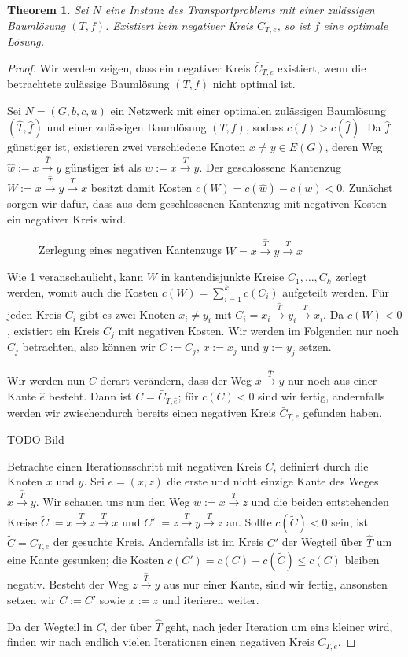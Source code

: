 \documentclass[a4paper,twoside,ngerman]{report}
\theoremstyle{plain}
\newtheorem{thm}{Theorem}
\theoremstyle{definition}
\begin{document}
\begin{thm}\label{opt}Sei $N$ eine Instanz des Transportproblems mit einer zulässigen Baumlösung $(T,f)$. Existiert kein negativer Kreis $\bar{C}_{T,e}$, so ist $f$ eine optimale Lösung.\end{thm}
\begin{proof}Wir werden zeigen, dass ein negativer Kreis $\bar{C}_{T,e}$ existiert, wenn die betrachtete zulässige Baumlösung $(T,f)$ nicht optimal ist.
	
Sei $N=(G,b,c,u)$ ein Netzwerk mit einer optimalen zulässigen Baumlösung $(\hat{T},\hat{f})$ und einer zulässigen Baumlösung $(T,f)$, sodass $c(f)>c(\hat{f})$. Da $\hat{f}$ günstiger ist, existieren zwei verschiedene Knoten $x\neq y\in E(G)$, deren Weg $\hat{w}:=x\xrightarrow{\hat{T}}y$ günstiger ist als $w:=x\xrightarrow{T}y$. Der geschlossene Kantenzug $W:=x\xrightarrow{\hat{T}}y\xrightarrow{T}x$ besitzt damit Kosten $c(W)=c(\hat{w})-c(w)<0$. Zunächst sorgen wir dafür, dass aus dem geschlossenen Kantenzug mit negativen Kosten ein negativer Kreis wird.

\begin{figure}[!h]\centering
	
\caption{Zerlegung eines negativen Kantenzugs $W=x\xrightarrow{\hat{T}}y\xrightarrow{T}x$}
\label{fig:decomp}
\end{figure}

Wie \cref{fig:decomp} veranschaulicht, kann $W$ in kantendisjunkte Kreise $C_1,\ldots,C_k$ zerlegt werden, womit auch die Kosten $c(W)=\sum_{i=1}^{k}c(C_i)$ aufgeteilt werden. Für jeden Kreis $C_i$ gibt es zwei Knoten $x_i\neq y_i$ mit $C_i=x_i\xrightarrow{\hat{T}}y_i\xrightarrow{T}x_i$. Da $c(W)<0$, existiert ein Kreis $C_j$ mit negativen Kosten. Wir werden im Folgenden nur noch $C_j$ betrachten, also können wir $C:=C_j$, $x:=x_j$ und $y:=y_j$ setzen.

Wir werden nun $C$ derart verändern, dass der Weg $x\xrightarrow{\hat{T}}y$ nur noch aus einer Kante $\hat{e}$ besteht. Dann ist $C=\bar{C}_{T,\hat{e}}$; für $c(C)<0$ sind wir fertig, andernfalls werden wir zwischendurch bereits einen negativen Kreis $\bar{C}_{T,e}$ gefunden haben.

TODO Bild

Betrachte einen Iterationsschritt mit negativen Kreis $C$, definiert durch die Knoten $x$ und $y$. Sei $e=(x,z)$ die erste und nicht einzige Kante des Weges $x\xrightarrow{\hat{T}}y$. Wir schauen uns nun den Weg $w:=x\xrightarrow{T}z$ und die beiden entstehenden Kreise $\tilde{C}:=x\xrightarrow{\hat{T}}z\xrightarrow{T}x$ und $C':=z\xrightarrow{\hat{T}}y\xrightarrow{T}z$ an. Sollte $c(\tilde{C})<0$ sein, ist $\tilde{C}=\bar{C}_{T,e}$ der gesuchte Kreis. Andernfalls ist im Kreis $C'$ der Wegteil über $\hat{T}$ um eine Kante gesunken; die Kosten $c(C')=c(C)-c(\tilde{C})\leq c(C)$ bleiben negativ. Besteht der Weg $z\xrightarrow{\hat{T}}y$ aus nur einer Kante, sind wir fertig, ansonsten setzen wir $C:=C'$ sowie $x:=z$ und iterieren weiter.

Da der Wegteil in $C$, der über $\hat{T}$ geht, nach jeder Iteration um eins kleiner wird, finden wir nach endlich vielen Iterationen einen negativen Kreis $\bar{C}_{T,e}$.\end{proof}
\end{document}

